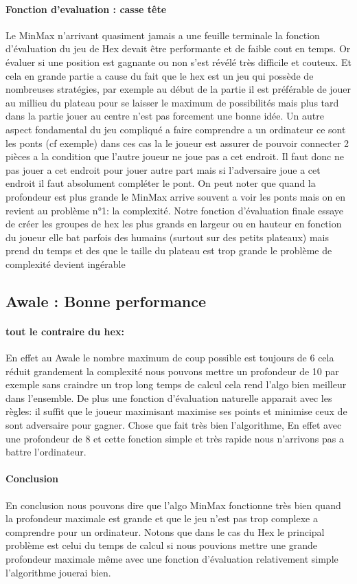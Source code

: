\paragraph{Fonction d'evaluation : casse tête}Le MinMax n'arrivant quasiment jamais a une feuille terminale la fonction d'évaluation du jeu de Hex devait être performante et de faible cout en temps. Or évaluer si une position est gagnante ou non s'est révélé très difficile et couteux. Et cela en grande partie a cause du fait que le hex est un jeu qui possède de nombreuses stratégies, par exemple au début de la partie il est préférable de jouer au millieu du plateau pour se laisser le maximum de possibilités mais plus tard dans la partie jouer au centre n'est pas forcement une bonne idée. Un autre aspect fondamental du jeu compliqué a faire comprendre a un ordinateur ce sont les ponts (cf exemple) dans ces cas la le joueur est assurer de pouvoir connecter 2 pièces a la condition que l'autre joueur ne joue pas a cet endroit. Il faut donc ne pas jouer a cet endroit pour jouer autre part mais si l'adversaire joue a cet endroit il faut absolument compléter le pont. On peut noter que quand la profondeur est plus grande le MinMax arrive souvent a voir les ponts mais on en revient au problème n°1: la complexité.
Notre fonction d'évaluation finale essaye de créer les groupes de hex les plus grands en largeur ou en hauteur en fonction du joueur elle bat parfois des humains (surtout sur des petits plateaux) mais prend du temps et des que le taille du plateau est trop grande le problème de complexité devient ingérable

\subsection {Awale : Bonne performance}
\paragraph {tout le contraire du hex:}En effet au Awale le nombre maximum de coup possible est toujours de 6 cela réduit grandement la complexité nous pouvons mettre un profondeur de 10 par exemple sans craindre un trop long temps de calcul cela rend l'algo bien meilleur dans l'ensemble.
De plus une fonction d'évaluation naturelle apparait avec les règles: il suffit que le joueur maximisant maximise ses points et minimise ceux de sont adversaire pour gagner. Chose que fait très bien l'algorithme, En effet avec une profondeur de 8 et cette fonction simple et très rapide nous n'arrivons pas a battre l'ordinateur.

\paragraph {Conclusion}En conclusion nous pouvons dire que l'algo MinMax fonctionne très bien quand la profondeur maximale est grande et que le jeu n'est pas trop complexe a comprendre pour un ordinateur. Notons que dans le cas du Hex le principal problème est celui du temps de calcul si nous pouvions mettre une grande profondeur maximale même avec une fonction d'évaluation relativement simple l'algorithme jouerai bien. 